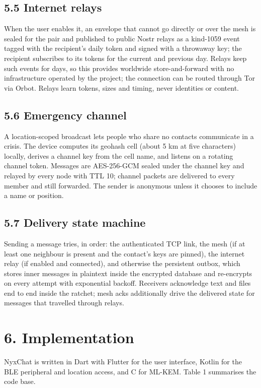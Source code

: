 \documentclass[conference]{IEEEtran}
\begin{document}
\subsection{5.5 Internet relays}
When the user enables it, an envelope that cannot go directly or over the mesh is sealed for the pair and published to public Nostr relays \cite{ref25} as a kind-1059 event \cite{ref26} tagged with the recipient's daily token and signed with a throwaway key; the recipient subscribes to its tokens for the current and previous day. Relays keep such events for days, so this provides worldwide store-and-forward with no infrastructure operated by the project; the connection can be routed through Tor via Orbot. Relays learn tokens, sizes and timing, never identities or content.

\subsection{5.6 Emergency channel}
A location-scoped broadcast lets people who share no contacts communicate in a crisis. The device computes its geohash cell (about 5 km at five characters) locally, derives a channel key from the cell name, and listens on a rotating channel token. Messages are AES-256-GCM sealed under the channel key and relayed by every node with TTL 10; channel packets are delivered to every member and still forwarded. The sender is anonymous unless it chooses to include a name or position.

\subsection{5.7 Delivery state machine}
Sending a message tries, in order: the authenticated TCP link, the mesh (if at least one neighbour is present and the contact's keys are pinned), the internet relay (if enabled and connected), and otherwise the persistent outbox, which stores inner messages in plaintext inside the encrypted database and re-encrypts on every attempt with exponential backoff. Receivers acknowledge text and files end to end inside the ratchet; mesh acks additionally drive the delivered state for messages that travelled through relays.

\section{6. Implementation}
NyxChat is written in Dart with Flutter for the user interface, Kotlin for the BLE peripheral and location access, and C for ML-KEM. Table 1 summarises the code base.
\end{document}

